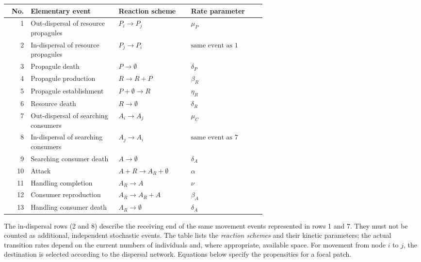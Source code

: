 \begin{center}
\small
\renewcommand{\arraystretch}{1.19}
\begin{tabular}{@{}r p{0.34\linewidth} p{0.28\linewidth} l@{}}
\hline
No. & Elementary event & Reaction scheme & Rate parameter \\
\hline
1 & Out-dispersal of resource propagules & $ P_i \to P_j $ & $ \mu_P $ {equation}\label{outPopagule} \\
2 & In-dispersal of resource propagules & $ P_j \to P_i $ & $ \text{same event as 1} $ {equation}\label{inPopagule} \\
3 & Propagule death & $ P \to \emptyset $ & $ \delta_P $ {equation}\label{PopaguleDeath} \\
4 & Propagule production & $ R \to R+P $ & $ \beta_R $ {equation}\label{Birth_P} \\
5 & Propagule establishment & $ P+\emptyset \to R $ & $ \eta_R $ {equation}\label{Establishment_P} \\
6 & Resource death & $ R \to \emptyset $ & $ \delta_R $ {equation}\label{Death_R} \\
7 & Out-dispersal of searching consumers & $ A_i \to A_j $ & $ \mu_C $ {equation}\label{outSearching} \\
8 & In-dispersal of searching consumers & $ A_j \to A_i $ & $ \text{same event as 7} $ {equation}\label{inSearching} \\
9 & Searching consumer death & $ A \to \emptyset $ & $ \delta_A $ {equation}\label{Death_A} \\
10 & Attack & $ A+R \to A_R+\emptyset $ & $ \alpha $ {equation}\label{Attack} \\
11 & Handling completion & $ A_R \to A $ & $ \nu $ {equation}\label{Handling} \\
12 & Consumer reproduction & $ A_R \to A_R+A $ & $ \beta_A $ {equation}\label{Growth_A} \\
13 & Handling consumer death & $ A_R \to \emptyset $ & $ \delta_A $ {equation}\label{Death_AR} \\
\hline
\end{tabular}
\end{center}
\noindent The in-dispersal rows (2 and 8) describe the receiving end of the same movement events represented in rows 1 and 7. They must not be counted as additional, independent stochastic events. The table lists the \emph{reaction schemes} and their kinetic parameters; the actual transition rates depend on the current numbers of individuals and, where appropriate, available space. For movement from node $i$ to $j$, the destination is selected according to the dispersal network. Equations below specify the propensities for a focal patch.

